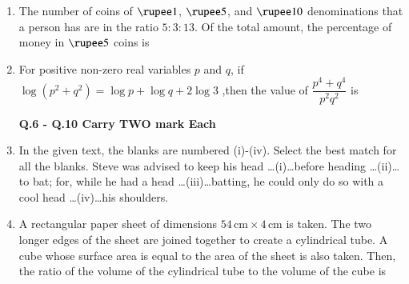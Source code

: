 \documentclass[journal,12pt,onecolumn]{IEEEtran}
\theoremstyle{remark}
\begin{document}
\begin{enumerate}
\item 
The number of coins of $ \rupee 1  $, $\rupee 5$, and $\rupee 10$ denominations that a person has are in the ratio $5:3:13$.  
Of the total amount, the percentage of money in $\rupee 5$ coins is  
\begin{enumerate}
\end{enumerate}


\item 
For positive non-zero real variables $p$ and $q$, if $\log (p^2 + q^2) = \log p + \log q + 2 \log 3$ ,then the value of $\dfrac{p^4+q^4}{p^2 q^2}$ is  
\begin{enumerate}
\end{enumerate}

\textbf{Q.6 - Q.10 Carry TWO mark Each}

\item  In the given text, the blanks are numbered (i)-(iv). Select the best match for all the blanks.  Steve was advised to keep his head \dots(i)\dots before heading \dots(ii)\dots to bat; for, while he had a head \dots(iii)\dots batting, he could only do so with a cool head \dots(iv)\dots his shoulders.  
\begin{enumerate}
\end{enumerate}


\item 
A rectangular paper sheet of dimensions $54 \,\text{cm} \times 4 \,\text{cm}$ is taken.  
The two longer edges of the sheet are joined together to create a cylindrical tube.  
A cube whose surface area is equal to the area of the sheet is also taken.  
Then, the ratio of the volume of the cylindrical tube to the volume of the cube is  
\begin{enumerate}
\end{enumerate}


\end{enumerate}
\end{document}
